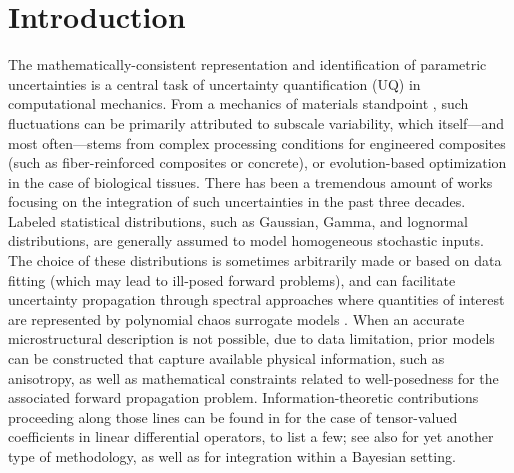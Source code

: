 \chapter{Introduction}
\label{chap:Introduction}

The mathematically-consistent representation and identification of parametric uncertainties is a central task of uncertainty quantification (UQ) in computational mechanics. From a mechanics of materials standpoint \cite{GUILLEMINOT2020385}, such fluctuations can be primarily attributed to subscale variability, which itself---and most often---stems from complex processing conditions for engineered composites (such as fiber-reinforced composites or concrete), or evolution-based optimization in the case of biological tissues. There has been a tremendous amount of works focusing on the integration of such uncertainties in the past three decades. Labeled statistical distributions, such as Gaussian, Gamma, and lognormal distributions, are generally assumed to model homogeneous stochastic inputs. The choice of these distributions is sometimes arbitrarily made or based on data fitting (which may lead to ill-posed forward problems), and can facilitate uncertainty propagation through spectral approaches \cite{Ghanem1991, OLM, Ghanem2017} where quantities of interest are represented by polynomial chaos surrogate models \cite{Wiener,Cameron,Xiu2002,Soize2004}. When an accurate microstructural description is not possible, due to data limitation, prior models can be constructed that capture available physical information, such as anisotropy, as well as mathematical constraints related to well-posedness for the associated forward propagation problem. Information-theoretic contributions proceeding along those lines can be found in \cite{Soize2006,Guilleminot-IJNME-2017,Guilleminot-SIAM-2013,STABER2017399} for the case of tensor-valued coefficients in linear differential operators, to list a few; see also \cite{Grigoriu2016} for yet another type of methodology, as well as \cite{SOIZE2011} for integration within a Bayesian setting.

